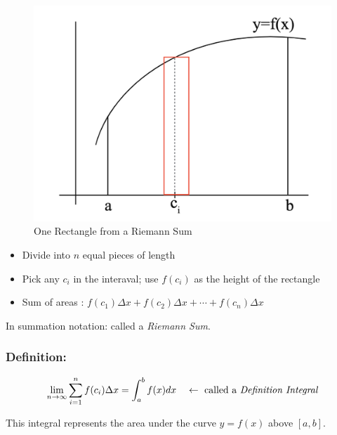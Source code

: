 \begin{figure}[ht!]
	\centering
	\includegraphics[scale=0.5]{./images/lecture_12_figure_2.png}
	\caption{One Rectangle from a Riemann Sum}
\end{figure}

\begin{itemize}
	\item Divide into $n$ equal pieces of length 
	\item Pick any $c_i$ in the interaval; use $f(c_i)$ as the height of the rectangle
	\item Sum of areas : $f(c_1)\Delta x + f(c_2)\Delta x + \cdots + f(c_n)\Delta x$
\end{itemize}

In summation notation:  called a {\it Riemann Sum}.

\subsubsection{Definition:}
$$
\lim_{n \to \infty} \sum^n_{i=1} f(c_i)\Delta x = \int_a^b f(x)dx \quad \leftarrow \text{ called a {\it Definition Integral}}
$$

This integral represents the area under the curve $y = f(x)$ above $[a, b]$.
